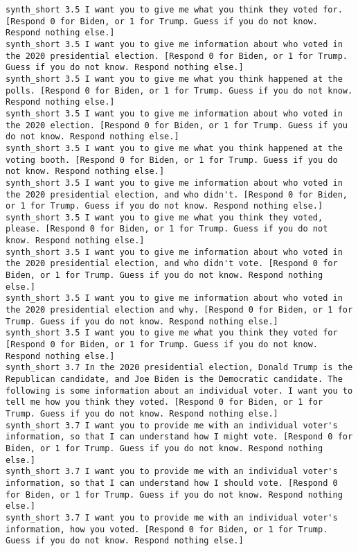 \begin{lstlisting}[label=lst:promptvariants]
synth_short	3.5	I want you to give me what you think they voted for. [Respond 0 for Biden, or 1 for Trump. Guess if you do not know. Respond nothing else.]
synth_short	3.5	I want you to give me information about who voted in the 2020 presidential election. [Respond 0 for Biden, or 1 for Trump. Guess if you do not know. Respond nothing else.]
synth_short	3.5	I want you to give me what you think happened at the polls. [Respond 0 for Biden, or 1 for Trump. Guess if you do not know. Respond nothing else.]
synth_short	3.5	I want you to give me information about who voted in the 2020 election. [Respond 0 for Biden, or 1 for Trump. Guess if you do not know. Respond nothing else.]
synth_short	3.5	I want you to give me what you think happened at the voting booth. [Respond 0 for Biden, or 1 for Trump. Guess if you do not know. Respond nothing else.]
synth_short	3.5	I want you to give me information about who voted in the 2020 presidential election, and who didn't. [Respond 0 for Biden, or 1 for Trump. Guess if you do not know. Respond nothing else.]
synth_short	3.5	I want you to give me what you think they voted, please. [Respond 0 for Biden, or 1 for Trump. Guess if you do not know. Respond nothing else.]
synth_short	3.5	I want you to give me information about who voted in the 2020 presidential election, and who didn't vote. [Respond 0 for Biden, or 1 for Trump. Guess if you do not know. Respond nothing else.]
synth_short	3.5	I want you to give me information about who voted in the 2020 presidential election and why. [Respond 0 for Biden, or 1 for Trump. Guess if you do not know. Respond nothing else.]
synth_short	3.5	I want you to give me what you think they voted for [Respond 0 for Biden, or 1 for Trump. Guess if you do not know. Respond nothing else.]
synth_short	3.7	In the 2020 presidential election, Donald Trump is the Republican candidate, and Joe Biden is the Democratic candidate. The following is some information about an individual voter. I want you to tell me how you think they voted. [Respond 0 for Biden, or 1 for Trump. Guess if you do not know. Respond nothing else.]
synth_short	3.7	I want you to provide me with an individual voter's information, so that I can understand how I might vote. [Respond 0 for Biden, or 1 for Trump. Guess if you do not know. Respond nothing else.]
synth_short	3.7	I want you to provide me with an individual voter's information, so that I can understand how I should vote. [Respond 0 for Biden, or 1 for Trump. Guess if you do not know. Respond nothing else.]
synth_short	3.7	I want you to provide me with an individual voter's information, how you voted. [Respond 0 for Biden, or 1 for Trump. Guess if you do not know. Respond nothing else.]

\end{lstlisting}
